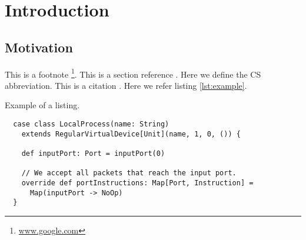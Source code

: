\chapter{Introduction}\label{chapter:intro}

\section{Motivation}\label{sec:motivation}

This is a footnote \footnote{\url{www.google.com}}.  This is a section
reference .  Here we define the
CS abbreviation.  This is a citation
\cite{stoenescu2016symnet}.  Here we refer listing \ref{lst:example}.

\begin{listing}[H]
  \caption{Example of a listing.}
  \label{lst:example}
  \begin{verbatim}
  case class LocalProcess(name: String)
    extends RegularVirtualDevice[Unit](name, 1, 0, ()) {

    def inputPort: Port = inputPort(0)

    // We accept all packets that reach the input port.
    override def portInstructions: Map[Port, Instruction] =
      Map(inputPort -> NoOp)
  }
  \end{verbatim}
\end{listing}
